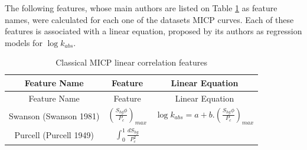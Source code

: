 \documentclass[english,msc,numbers]{coppe}
\begin{document}
  The following features, whose main authors are listed on Table \ref{tab:linear-feat} as feature names, were calculated for each one of the datasets MICP curves. Each of these features is associated with a linear equation, proposed by its authors as regression models for \(\log{k_{abs}}\).
  \begin{longtable}[]{@{}ccc@{}}
  \caption{\label{tab:linear-feat} Classical MICP linear correlation features}\tabularnewline
  \toprule
  \begin{minipage}[b]{0.27\columnwidth}\centering
  Feature Name\strut
  \end{minipage} & \begin{minipage}[b]{0.31\columnwidth}\centering
  Feature\strut
  \end{minipage} & \begin{minipage}[b]{0.33\columnwidth}\centering
  Linear Equation\strut
  \end{minipage}\tabularnewline
  \midrule
  \endfirsthead
  \toprule
  \begin{minipage}[b]{0.27\columnwidth}\centering
  Feature Name\strut
  \end{minipage} & \begin{minipage}[b]{0.31\columnwidth}\centering
  Feature\strut
  \end{minipage} & \begin{minipage}[b]{0.33\columnwidth}\centering
  Linear Equation\strut
  \end{minipage}\tabularnewline
  \midrule
  \endhead
  \begin{minipage}[t]{0.27\columnwidth}\centering
  Swanson \newline (Swanson 1981)\strut
  \end{minipage} & \begin{minipage}[t]{0.31\columnwidth}\centering
  \((\frac{S_{hg}\phi}{P_c})_{max}\)\strut
  \end{minipage} & \begin{minipage}[t]{0.33\columnwidth}\centering
  \(\log{k_{abs}}=a+b.(\frac{S_{hg}\phi}{P_c})_{max}\)\strut
  \end{minipage}\tabularnewline
  \begin{minipage}[t]{0.27\columnwidth}\centering
  Purcell \newline (Purcell 1949)\strut
  \end{minipage} & \begin{minipage}[t]{0.31\columnwidth}\centering
  \(\int_0^1{\frac{dS_{hg}}{P_c^2}}\)\strut
  \end{minipage} & \begin{minipage}[t]{0.33\columnwidth}\centering

\end{minipage}
\end{longtable}
\end{document}
